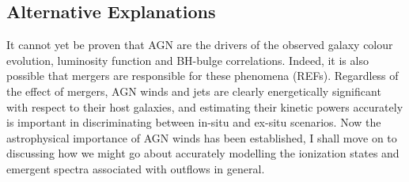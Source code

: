 \subsection{Alternative Explanations}

It cannot yet be proven that AGN are the drivers of the observed 
galaxy colour evolution, luminosity function and BH-bulge correlations.
Indeed, it is also possible that mergers are responsible for these phenomena 
(REFs). Regardless of the effect of mergers, AGN winds and jets are clearly 
energetically significant with respect to their host galaxies, and estimating
their kinetic powers accurately is important in discriminating between in-situ
and ex-situ scenarios. Now the astrophysical importance of AGN winds has 
been established, I shall move on to discussing how we might go about 
accurately modelling the ionization states and emergent spectra associated 
with outflows in general.


